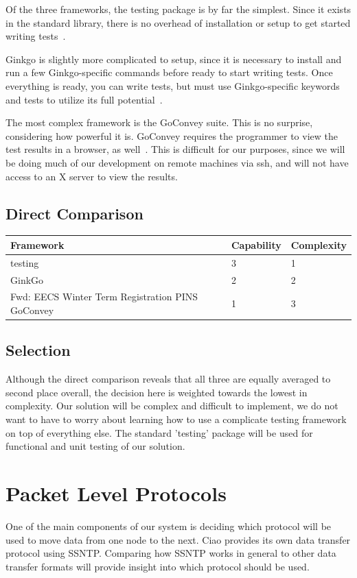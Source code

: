 \documentclass[10pt,letterpaper,onecolumn,draftclsnofoot]{IEEEtran}
\begin{document}
Of the three frameworks, the testing package is by far the simplest. Since it
exists in the standard library, there is no overhead of installation or setup to
get started writing tests~\cite{testing}.

Ginkgo is slightly more complicated to setup, since it is necessary to install
and run a few Ginkgo-specific commands before ready to start writing tests. Once
everything is ready, you can write tests, but must use Ginkgo-specific keywords
and tests to utilize its full potential~\cite{ginkgo}.

The most complex framework is the GoConvey suite. This is no surprise,
considering how powerful it is. GoConvey requires the programmer to view the
test results in a browser, as well~\cite{goconvey}. This is difficult for our
purposes, since we will be doing much of our development on remote machines via
ssh, and will not have access to an X server to view the results.

\subsection{Direct Comparison}

\begin{center}
	\begin{tabular}{| l | l | l |}
		\hline
		Framework & Capability & Complexity
		\\ \hline
		testing  & 3 & 1  \\ \hline
		GinkGo   & 2 & 2  \\ \hline
	Fwd: EECS Winter Term Registration PINS	GoConvey & 1 & 3  \\ \hline
	\end{tabular}
\end{center}

\subsection{Selection}
Although the direct comparison reveals that all three are equally averaged to
second place overall, the decision here is weighted towards the lowest in
complexity. Our solution will be complex and difficult to implement, we do not
want to have to worry about learning how to use a complicate testing framework
on top of everything else. The standard 'testing' package will be used for
functional and unit testing of our solution.

\section{Packet Level Protocols}
One of the main components of our system is deciding which protocol will be
used to move data from one node to the next. Ciao provides its own data
transfer protocol using SSNTP. Comparing how SSNTP works in general to other
data transfer formats will provide insight into which protocol should be used.
\end{document}
